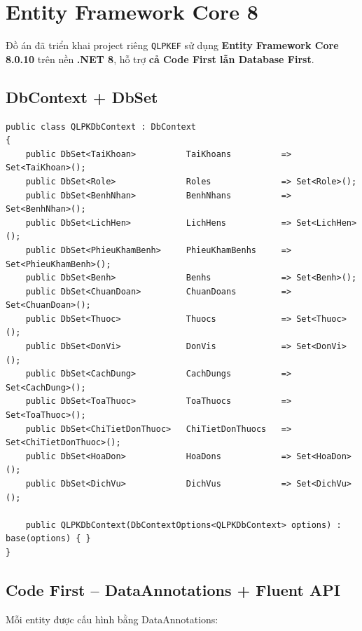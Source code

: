\documentclass[12pt,a4paper]{report}
\begin{document}
\section{Entity Framework Core 8}

Đồ án đã triển khai project riêng \texttt{QLPKEF} sử dụng \textbf{Entity Framework Core 8.0.10} trên nền \textbf{.NET 8}, hỗ trợ \textbf{cả Code First lẫn Database First}.

\subsection{DbContext + DbSet}

\begin{lstlisting}[style=csharp,caption={QLPKDbContext -- 14 DbSet ứng với 14 bảng nghiệp vụ}]
public class QLPKDbContext : DbContext
{
    public DbSet<TaiKhoan>          TaiKhoans          => Set<TaiKhoan>();
    public DbSet<Role>              Roles              => Set<Role>();
    public DbSet<BenhNhan>          BenhNhans          => Set<BenhNhan>();
    public DbSet<LichHen>           LichHens           => Set<LichHen>();
    public DbSet<PhieuKhamBenh>     PhieuKhamBenhs     => Set<PhieuKhamBenh>();
    public DbSet<Benh>              Benhs              => Set<Benh>();
    public DbSet<ChuanDoan>         ChuanDoans         => Set<ChuanDoan>();
    public DbSet<Thuoc>             Thuocs             => Set<Thuoc>();
    public DbSet<DonVi>             DonVis             => Set<DonVi>();
    public DbSet<CachDung>          CachDungs          => Set<CachDung>();
    public DbSet<ToaThuoc>          ToaThuocs          => Set<ToaThuoc>();
    public DbSet<ChiTietDonThuoc>   ChiTietDonThuocs   => Set<ChiTietDonThuoc>();
    public DbSet<HoaDon>            HoaDons            => Set<HoaDon>();
    public DbSet<DichVu>            DichVus            => Set<DichVu>();

    public QLPKDbContext(DbContextOptions<QLPKDbContext> options) : base(options) { }
}
\end{lstlisting}

\subsection{Code First -- DataAnnotations + Fluent API}

Mỗi entity được cấu hình bằng DataAnnotations:
\end{document}
